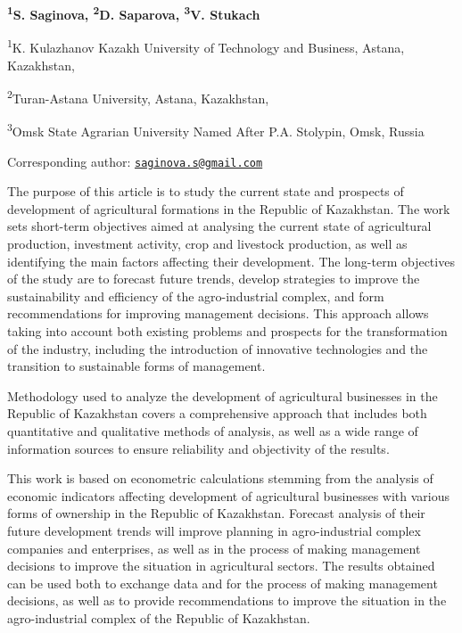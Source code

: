 
\begin{articleheader}

{\bfseries \textsuperscript{1}S. Saginova\textsuperscript{\envelope },
\textsuperscript{2}D. Saparova, \textsuperscript{3}V. Stukach}
\end{articleheader}
\begin{affiliation}

\textsuperscript{1}K. Kulazhanov Kazakh University of Technology and
Business, Astana, Kazakhstan,

\textsuperscript{2}Turan-Astana University, Astana, Kazakhstan,

\textsuperscript{3}Omsk State Agrarian University Named After P.A.
Stolypin, Omsk, Russia

\raggedright{\bfseries \textsuperscript{\envelope }}Corresponding author:
\href{mailto:saginova.s@gmail.com}{\nolinkurl{saginova.s@gmail.com}}
\end{affiliation}

The purpose of this article is to study the current state and prospects
of development of agricultural formations in the Republic of Kazakhstan.
The work sets short-term objectives aimed at analysing the current state
of agricultural production, investment activity, crop and livestock
production, as well as identifying the main factors affecting their
development. The long-term objectives of the study are to forecast
future trends, develop strategies to improve the sustainability and
efficiency of the agro-industrial complex, and form recommendations for
improving management decisions. This approach allows taking into account
both existing problems and prospects for the transformation of the
industry, including the introduction of innovative technologies and the
transition to sustainable forms of management.

Methodology used to analyze the development of agricultural businesses
in the Republic of Kazakhstan covers a comprehensive approach that
includes both quantitative and qualitative methods of analysis, as well
as a wide range of information sources to ensure reliability and
objectivity of the results.

This work is based on econometric calculations stemming from the
analysis of economic indicators affecting development of agricultural
businesses with various forms of ownership in the Republic of
Kazakhstan. Forecast analysis of their future development trends will
improve planning in agro-industrial complex companies and enterprises,
as well as in the process of making management decisions to improve the
situation in agricultural sectors. The results obtained can be used both
to exchange data and for the process of making management decisions, as
well as to provide recommendations to improve the situation in the
agro-industrial complex of the Republic of Kazakhstan.

